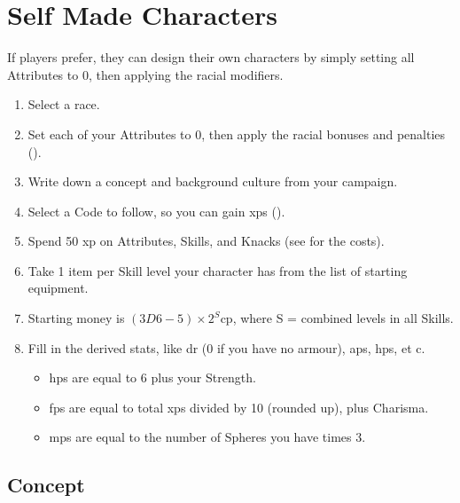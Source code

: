 \pagebreak[3]
\section{Self Made Characters}

\glsresetall

\begin{multicols}{2}

\label{playerchosen}

\noindent
If players prefer, they can design their own characters by simply setting all Attributes to 0, then applying the racial modifiers.

\begin{enumerate}
  \item\label{sumCCrace}
  Select a race.
  \item\label{sumCCatt}
  Set each of your Attributes to 0, then apply the racial bonuses and penalties ().
  \item\label{sumCCconcept}
  Write down a concept and background culture from your campaign.
  \item\label{sumCCcode}
  Select a Code to follow, so you can gain \glspl{xp} ().
  \item\label{sumCCxp}
  Spend 50 \gls{xp} on Attributes, Skills, and Knacks (see  for the costs).
  \item\label{sumCCequip}
  Take 1 item per Skill level your character has from the list of starting equipment.
  \item\label{sumCCcoin}
  Starting money is $(3D6-5)\times 2^S$\gls{cp}, where S = combined levels in all Skills.
  \item\label{sumCCder}
  Fill in the derived stats, like \gls{dr} (0 if you have no armour), \glspl{ap}, \glspl{hp}, et c.
  \begin{itemize}
    \item
    \glspl{hp} are equal to 6 plus your Strength.
    \item
    \glspl{fp} are equal to total \glspl{xp} divided by 10 (rounded up), plus Charisma.
    \item
    \glspl{mp} are equal to the number of Spheres you have times 3.
  \end{itemize}
\end{enumerate}

\subsection{Concept}


\end{multicols}
